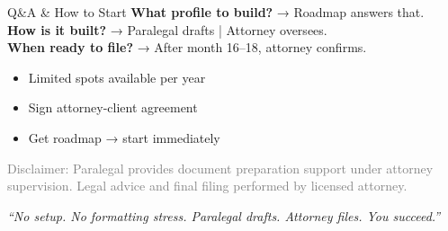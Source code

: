 \documentclass[aspectratio=169, 10pt]{beamer}
\begin{document}
	\begin{frame}{Q\&A \& How to Start}
		\centering
		\textbf{\Large What profile to build?} → Roadmap answers that. \\
		\textbf{\Large How is it built?} → Paralegal drafts | Attorney oversees. \\
		\textbf{\Large When ready to file?} → After month 16--18, attorney confirms.
		
		\vspace{0.5cm}
		\begin{itemize}
			\item Limited spots available per year
			\item Sign attorney-client agreement
			\item Get roadmap → start immediately
		\end{itemize}
		
		\vspace{0.3cm}
		{\tiny \textcolor{gray}{Disclaimer: Paralegal provides document preparation support under attorney supervision. Legal advice and final filing performed by licensed attorney.}}
		
		\vspace{0.2cm}
		\textit{``No setup. No formatting stress. Paralegal drafts. Attorney files. You succeed.''}
	\end{frame}
	
\end{document}

